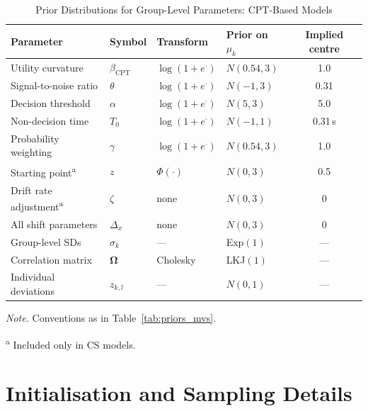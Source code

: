 \documentclass[man,floatsintext]{apa7}
\begin{document}
\begin{table}[!htbp]
\centering
\begin{threeparttable}
\caption{Prior Distributions for Group-Level Parameters: CPT-Based Models}
\label{tab:priors_cpt}
\begin{tabular}{llllc}
\toprule
\textbf{Parameter} & \textbf{Symbol} & \textbf{Transform} & \textbf{Prior on $\mu_k$} & \textbf{Implied centre} \\
\midrule
Utility curvature             & $\beta_{\text{CPT}}$ & $\log(1{+}e^{\cdot})$ & $N(0.54, 3)$ & 1.0 \\
Signal-to-noise ratio         & $\theta$     & $\log(1{+}e^{\cdot})$ & $N(-1, 3)$   & 0.31 \\
Decision threshold            & $\alpha$     & $\log(1{+}e^{\cdot})$ & $N(5, 3)$    & 5.0 \\
Non-decision time             & $T_0$        & $\log(1{+}e^{\cdot})$ & $N(-1, 1)$   & 0.31\,s \\
Probability weighting         & $\gamma$     & $\log(1{+}e^{\cdot})$ & $N(0.54, 3)$ & 1.0 \\
Starting point\textsuperscript{a}  & $z$    & $\Phi(\cdot)$         & $N(0, 3)$    & 0.5 \\
Drift rate adjustment\textsuperscript{a} & $\zeta$ & none           & $N(0, 3)$    & 0 \\
All shift parameters          & $\Delta_x$   & none                  & $N(0, 3)$    & 0 \\
Group-level SDs               & $\sigma_k$   & ---                   & Exp$(1)$     & --- \\
Correlation matrix            & $\mathbf{\Omega}$ & Cholesky         & LKJ$(1)$     & --- \\
Individual deviations         & $z_{k,l}$    & ---                   & $N(0, 1)$    & --- \\
\bottomrule
\end{tabular}
\begin{tablenotes}[flushleft]
\small
\item \textit{Note.} Conventions as in Table~\ref{tab:priors_mvs}.
\item \textsuperscript{a} Included only in CS models.
\end{tablenotes}
\end{threeparttable}
\end{table}

\section{Initialisation and Sampling Details}
\label{sec:sampling}
\end{document}
